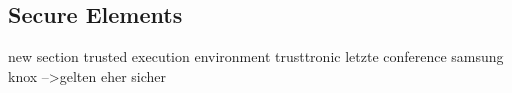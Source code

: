 \subsection{Secure Elements}\label{subsection:external-secure}

new section trusted execution environment
trusttronic letzte conference
samsung knox
-->gelten eher sicher
